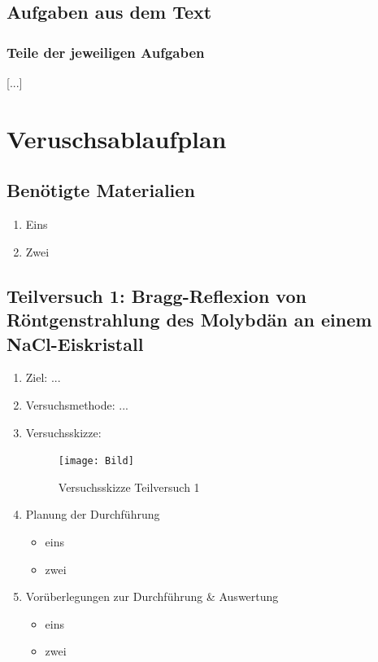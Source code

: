 \documentclass{article}
\begin{document}
\subsection{Aufgaben aus dem Text}

    \subsubsection{Teile der jeweiligen Aufgaben}
[...]


\newpage

\section{Veruschsablaufplan}

\begin{center}

\end{center}

\subsection{Benötigte Materialien}
    \begin{enumerate}[label=\arabic*.]
        \item Eins
        \item Zwei
    \end{enumerate}

\newpage

\subsection{Teilversuch 1: Bragg-Reflexion von Röntgenstrahlung des Molybdän an einem NaCl-Eiskristall}
\begin{enumerate}[label = (\Roman*)]
    \item Ziel: ...
    
    \item Versuchsmethode: ...
    
    \item Versuchsskizze:
    
        \begin{figure}[H]
        \centering
        \texttt{[image: Bild]}
        \caption{Versuchsskizze Teilversuch 1}
        \end{figure}

    \item Planung der Durchführung
        \begin{itemize}
            \item eins
            \item zwei
        \end{itemize}

    \item Vorüberlegungen zur Durchführung \& Auswertung
        \begin{itemize}
            \item eins
            \item zwei
        \end{itemize}
    
\end{enumerate}
\end{document}

